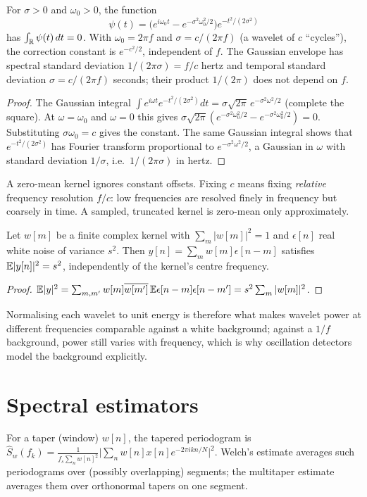 \begin{theorem}\label{ars:filt-003}
For $\sigma>0$ and $\omega_0>0$, the function
\[\psi(t)=\bigl(e^{i\omega_0t}-e^{-\sigma^2\omega_0^2/2}\bigr)e^{-t^2/(2\sigma^2)}\]
has $\int_\mathbb R\psi(t)\,dt=0$. With $\omega_0=2\pi f$ and $\sigma=c/(2\pi f)$ (a wavelet of $c$ ``cycles''), the correction constant is $e^{-c^2/2}$, independent of $f$. The Gaussian envelope has spectral standard deviation $1/(2\pi\sigma)=f/c$ hertz and temporal standard deviation $\sigma=c/(2\pi f)$ seconds; their product $1/(2\pi)$ does not depend on $f$.
\end{theorem}
\begin{proof}
The Gaussian integral $\int e^{i\omega t}e^{-t^2/(2\sigma^2)}dt=\sigma\sqrt{2\pi}\,e^{-\sigma^2\omega^2/2}$ (complete the square). At $\omega=\omega_0$ and $\omega=0$ this gives $\sigma\sqrt{2\pi}(e^{-\sigma^2\omega_0^2/2}-e^{-\sigma^2\omega_0^2/2})=0$. Substituting $\sigma\omega_0=c$ gives the constant. The same Gaussian integral shows that $e^{-t^2/(2\sigma^2)}$ has Fourier transform proportional to $e^{-\sigma^2\omega^2/2}$, a Gaussian in $\omega$ with standard deviation $1/\sigma$, i.e.\ $1/(2\pi\sigma)$ in hertz.
\end{proof}
A zero-mean kernel ignores constant offsets. Fixing $c$ means fixing \emph{relative} frequency resolution $f/c$: low frequencies are resolved finely in frequency but coarsely in time. A sampled, truncated kernel is zero-mean only approximately.

\begin{theorem}\label{ars:filt-004}
Let $w[m]$ be a finite complex kernel with $\sum_m|w[m]|^2=1$ and $\epsilon[n]$ real white noise of variance $s^2$. Then $y[n]=\sum_m w[m]\epsilon[n-m]$ satisfies $\mathbb E|y[n]|^2=s^2$, independently of the kernel's centre frequency.
\end{theorem}
\begin{proof}
$\mathbb E|y|^2=\sum_{m,m'}w[m]\overline{w[m']}\,\mathbb E\epsilon[n-m]\epsilon[n-m']=s^2\sum_m|w[m]|^2$.
\end{proof}
Normalising each wavelet to unit energy is therefore what makes wavelet power at different frequencies comparable against a white background; against a $1/f$ background, power still varies with frequency, which is why oscillation detectors model the background explicitly.

\section{Spectral estimators}
For a taper (window) $w[n]$, the tapered periodogram is $\hat S_w(f_k)=\frac{1}{f_s\sum_n w[n]^2}\bigl|\sum_n w[n]x[n]e^{-2\pi ikn/N}\bigr|^2$. Welch's estimate averages such periodograms over (possibly overlapping) segments; the multitaper estimate averages them over orthonormal tapers on one segment.

